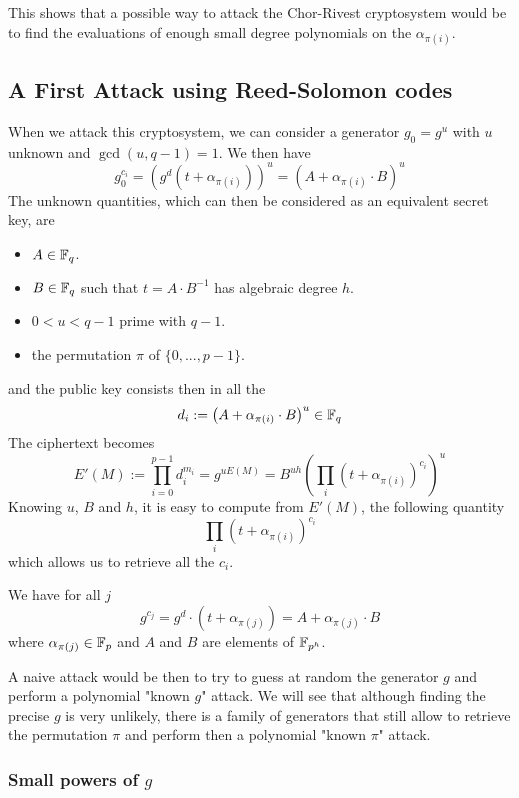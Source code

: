 \documentclass[a4paper]{article}
\newcommand{\GF}[1]{\F_{#1}}
\begin{document}
This shows that a possible way to attack the Chor-Rivest cryptosystem would be to find the evaluations of enough small degree polynomials on the $\alpha_{\pi(i)}$.



\subsection{A First Attack using Reed-Solomon codes}


When we attack this cryptosystem, we can consider a generator $g_0 = g^u$ with $u$ unknown and $\gcd(u, q-1) = 1$. We then have
$$ g_0^{c_i} = \left( g^d \left( t + \alpha_{\pi(i)} \right) \right)^u = \left(A + \alpha_{\pi(i)} \cdot B\right)^u$$
The unknown quantities, which can then be considered as an equivalent secret key, are
\begin{itemize}
\item $A \in \mathbb{F}_q$.
\item $B \in \mathbb{F}_q$ such that $t = A\cdot B^{-1}$ has algebraic degree $h$.
\item $0 < u < q-1$ prime with $q-1$.
\item the permutation $\pi$ of $\{ 0, ... , p-1 \}$.
\end{itemize}
and the public key consists then in all the
$$ d_i := \left(A + \alpha_{\pi(i)} \cdot B\right)^u \in \mathbb{F}_q$$
The ciphertext becomes
$$ E'(M) := \prod_{i=0}^{p-1} d_i^{m_i} = g^{uE(M)} = B^{uh} \left( \prod_i \left( t + \alpha_{\pi(i)}\right)^{c_i} \right)^u$$
Knowing $u$, $B$ and $h$, it is easy to compute from $E'(M)$, the following quantity
$$ \prod_i \left( t + \alpha_{\pi(i)}\right)^{c_i} $$
which allows us to retrieve all the $c_i$.



We have for all $j$
$$ g^{c_j} = g^d \cdot (t + \alpha_{\pi(j)} ) = A + \alpha_{\pi(j)} \cdot B $$
where $\alpha_{\pi(j)} \in \GF{p}$ and $A$ and $B$ are elements of $\GF{p^h}$.

A naive attack would be then to try to guess at random the generator $g$ and perform a polynomial "known $g$" attack. We will see that although finding the precise $g$ is very unlikely, there is a family of generators that still allow to retrieve the permutation $\pi$ and perform then a polynomial "known $\pi$" attack.

\subsubsection{Small powers of $g$}
\end{document}
